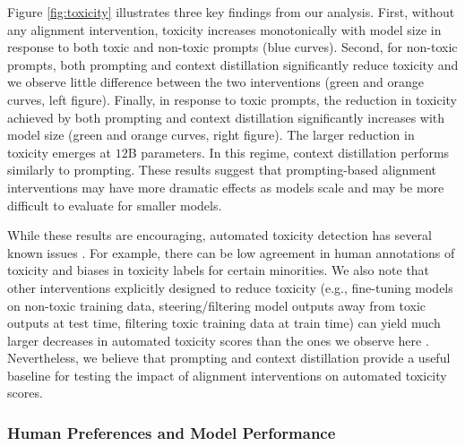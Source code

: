 Figure \ref{fig:toxicity} illustrates three key findings from our analysis. First, without any alignment intervention, toxicity increases monotonically with model size in response to both toxic and non-toxic prompts (blue curves). Second, for non-toxic prompts, both prompting and context distillation significantly reduce toxicity and we observe little difference between the two interventions (green and orange curves, left figure). Finally, in response to toxic prompts, the reduction in toxicity achieved by both prompting and context distillation significantly increases with model size (green and orange curves, right figure). The larger reduction in toxicity emerges at $12$B parameters. In this regime, context distillation performs similarly to prompting. These results suggest that prompting-based alignment interventions may have more dramatic effects as models scale and may be more difficult to evaluate for smaller models.

While these results are encouraging, automated toxicity detection has several known issues \cite{gehman2020realtoxicityprompts, ToxicityChallenges}. For example, there can be low agreement in human annotations of toxicity and biases in toxicity labels for certain minorities. We also note that other interventions explicitly designed to reduce toxicity (e.g., fine-tuning models on non-toxic training data, steering/filtering model outputs away from toxic outputs at test time, filtering toxic training data at train time) can yield much larger decreases in automated toxicity scores than the ones we observe here \cite{gehman2020realtoxicityprompts, ToxicityChallenges}. Nevertheless, we believe that prompting and context distillation provide a useful baseline for testing the impact of alignment interventions on automated toxicity scores.

\subsubsection{Human Preferences and Model Performance}

